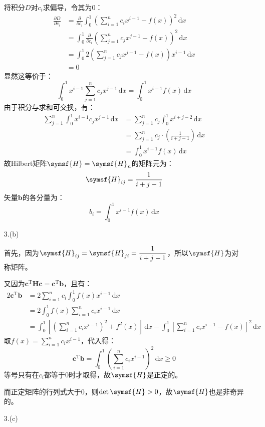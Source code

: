 \documentclass[a4paper]{article}
\renewcommand\mathsf{\symsf}
\renewcommand{\bm}{\symbf}
\begin{document}
\begin{enumerate}
将积分$D$对$c_i$求偏导，令其为0：
\begin{align*}
    \frac{\partial D}{\partial c_i}
    &= \frac{\partial}{\partial c_i}\int_0^1 \left(\sum_{i=1}^n c_i x^{i-1} -f(x)\right)^2\,\mathrm{d}x \\
    &= \int_0^1 \frac{\partial}{\partial c_i}\left(\sum_{j=1}^n c_j x^{j-1} -f(x)\right)^2\,\mathrm{d}x \\
    &= \int_0^1 2\left(\sum_{j=1}^n c_j x^{j-1} -f(x)\right)x^{i-1}\,\mathrm{d}x \\
    &= 0
\end{align*}
显然这等价于：
\[
    \int_0^1 x^{i-1} \sum_{j=1}^n c_j x^{j-1}\,\mathrm{d}x = \int_0^1 x^{i-1}f(x)\,\mathrm{d}x
\]
由于积分与求和可交换，有：
\begin{align*}
    \sum_{j=1}^n \int_0^1 x^{i-1} c_j x^{j-1}\,\mathrm{d}x
    &= \sum_{j=1}^n c_j \int_0^1 x^{i+j-2}\,\mathrm{d}x \\
    &= \sum_{j=1}^n c_j\cdot\left(\frac{1}{i+j-1}\right)\,\mathrm{d}x \\
    &= \int_0^1 x^{i-1}f(x)\,\mathrm{d}x
\end{align*}
故Hilbert矩阵$\mathsf{H}=\mathsf{H}_n$的矩阵元为：
\[
    \mathsf{H}_{ij} = \frac{1}{i+j-1}
\]
矢量$\bm{b}$的各分量为：
\[
    b_i = \int_0^1 x^{i-1}f(x)\,\mathrm{d}x
\]

\item[3.(b)]

首先，因为$\mathsf{H}_{ij}=\mathsf{H}_{ji}=\dfrac{1}{i+j-1}$，所以$\mathsf{H}$为对称矩阵。

又因为$\bm{c}^\mathrm{T}\symbf{H}\bm{c}=\bm{c}^\mathrm{T}\bm{b}$，且有：
\begin{align*}
    2\bm{c}^\mathrm{T}\bm{b}
    &= 2\sum_{i=1}^n c_i \int_0^1 f(x)x^{i-1}\,\mathrm{d}x \\
    &= 2\int_0^1 f(x) \sum_{i=1}^n c_i x^{i-1}\,\mathrm{d}x \\
    &= \int_0^1 \left[\left(\sum_{i=1}^n c_i x^{i-1}\right)^2 + f^2(x)\right]\,\mathrm{d}x - \int_0^1 \left[\sum_{i=1}^n c_i x^{i-1} - f(x)\right]^2\,\mathrm{d}x
\end{align*}
取$f(x)=\sum\limits_{i=1}^n c_i x^{i-1}$，代入得：
\[
    \bm{c}^\mathrm{T}\bm{b} = \int_0^1 \left(\sum_{i=1}^n c_i x^{i-1}\right)^2\,\mathrm{d}x \geqslant 0
\]
等号只有在$c_i$都等于0时才取得，故$\mathsf{H}$是正定的。

而正定矩阵的行列式大于0，则$\det\mathsf{H}>0$，故$\mathsf{H}$也是非奇异的。

\item[3.(c)]


\end{enumerate}
\end{document}
